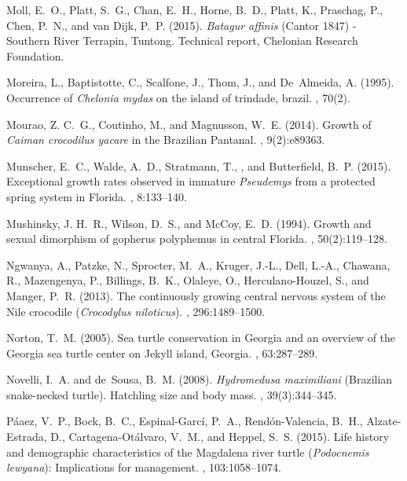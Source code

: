 \documentclass{article}
\begin{document}
\begin{thebibliography}{}
Moll, E.~O., Platt, S.~G., Chan, E.~H., Horne, B.~D., Platt, K., Praschag, P.,
  Chen, P.~N., and van Dijk, P.~P. (2015).
\newblock \emph{Batagur affinis} ({C}antor 1847) - {S}outhern {R}iver
  {T}errapin, {T}untong.
\newblock Technical report, Chelonian Research Foundation.

Moreira, L., Baptistotte, C., Scalfone, J., Thom, J., and De~Almeida, A.
  (1995).
\newblock Occurrence of \emph{Chelonia mydas} on the island of trindade,
  brazil.
, 70(2).

Mourao, Z. C.~G., Coutinho, M., and Magnusson, W.~E. (2014).
\newblock Growth of \emph{Caiman crocodilus yacare} in the {B}razilian
  {P}antanal.
, 9(2):e89363.

Munscher, E.~C., Walde, A.~D., Stratmann, T., , and Butterfield, B.~P. (2015).
\newblock Exceptional growth rates observed in immature \emph{Pseudemys} from a
  protected spring system in {F}lorida.
, 8:133--140.

Mushinsky, J. H.~R., Wilson, D.~S., and McCoy, E.~D. (1994).
\newblock Growth and sexual dimorphism of gopherus polyphemus in central
  {F}lorida.
, 50(2):119--128.

Ngwanya, A., Patzke, N., Sprocter, M.~A., Kruger, J.-L., Dell, L.-A., Chawana,
  R., Mazengenya, P., Billings, B.~K., Olaleye, O., Herculano-Houzel, S., and
  Manger, P.~R. (2013).
\newblock The continuously growing central nervous system of the {N}ile
  crocodile (\emph{Crocodylus niloticus}).
, 296:1489--1500.

Norton, T.~M. (2005).
\newblock Sea turtle conservation in {G}eorgia and an overview of the {G}eorgia
  sea turtle center on {J}ekyll island, {G}eorgia.
, 63:287--289.

Novelli, I.~A. and de~Sousa, B.~M. (2008).
\newblock \emph{Hydromedusa maximiliani} ({B}razilian snake-necked turtle).
  {H}atchling size and body mass.
, 39(3):344--345.

P\'{a}aez, V.~P., Bock, B.~C., Espinal-Garc\'{i}, P.~A., Rend\'{o}n-Valencia,
  B.~H., Alzate-Estrada, D., Cartagena-Ot\'{a}lvaro, V.~M., and Heppel, S.~S.
  (2015).
\newblock Life history and demographic characteristics of the {M}agdalena river
  turtle (\emph{Podocnemis lewyana}): {I}mplications for management.
, 103:1058--1074.


\end{thebibliography}
\end{document}
